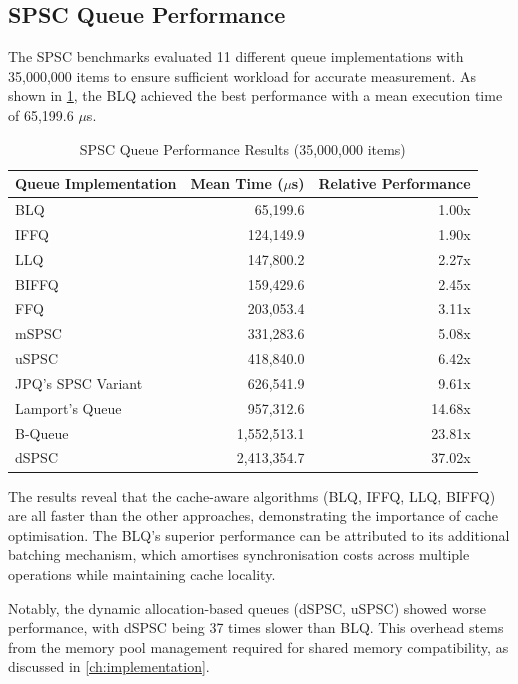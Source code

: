 \subsection{\acf{SPSC} Queue Performance}
The \ac{SPSC} benchmarks evaluated 11 different queue implementations with 35,000,000 items to ensure sufficient workload for accurate measurement. As shown in \cref{tab:spsc-results}, the \ac{BLQ} achieved the best performance with a mean execution time of 65,199.6 $\mu$s.

\begin{table}[htb]
\centering
\caption{\ac{SPSC} Queue Performance Results (35,000,000 items)}
\label{tab:spsc-results}
\begin{tabular}{@{}lrr@{}}
\toprule
Queue Implementation & Mean Time ($\mu$s) & Relative Performance \\
\midrule
\ac{BLQ} & 65,199.6 & 1.00x \\
\ac{IFFQ} & 124,149.9 & 1.90x \\
\ac{LLQ} & 147,800.2 & 2.27x \\
\ac{BIFFQ} & 159,429.6 & 2.45x \\
\ac{FFQ} & 203,053.4 & 3.11x \\
\ac{mSPSC} & 331,283.6 & 5.08x \\
\ac{uSPSC} & 418,840.0 & 6.42x \\
\ac{JPQ}'s \ac{SPSC} Variant & 626,541.9 & 9.61x \\
Lamport's Queue & 957,312.6 & 14.68x \\
B-Queue & 1,552,513.1 & 23.81x \\
\ac{dSPSC} & 2,413,354.7 & 37.02x \\
\bottomrule
\end{tabular}
\end{table}

The results reveal that the cache-aware algorithms (\ac{BLQ}, \ac{IFFQ}, \ac{LLQ}, \ac{BIFFQ}) are all faster than the other approaches, demonstrating the importance of cache optimisation. The \ac{BLQ}'s superior performance can be attributed to its additional batching mechanism, which amortises synchronisation costs across multiple operations while maintaining cache locality.

Notably, the dynamic allocation-based queues (\ac{dSPSC}, \ac{uSPSC}) showed worse performance, with \ac{dSPSC} being 37 times slower than \ac{BLQ}. This overhead stems from the memory pool management required for shared memory compatibility, as discussed in \cref{ch:implementation}.


